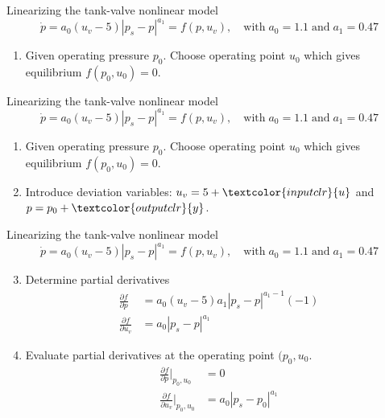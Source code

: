 \documentclass[presentation,aspectratio=169]{beamer}
\begin{document}
\begin{frame}[label={sec:orgcb3dd14}]{Linearizing the tank-valve nonlinear model}
\[ \dot{p} = a_0(u_v - 5)|p_s - p|^{a_1} = f(p, u_v), \quad \text{with} \; a_0=1.1\; \text{and}\; a_1 = 0.47\]
\begin{enumerate}
\item Given operating pressure \(p_0\). Choose operating point \(u_0\) which gives equilibrium \(f(p_0, u_0) = 0\).
\end{enumerate}
\end{frame}


\begin{frame}[label={sec:org56a6724}]{Linearizing the tank-valve nonlinear model}
\[ \dot{p} = a_0(u_v - 5)|p_s - p|^{a_1} = f(p, u_v), \quad \text{with} \; a_0=1.1\; \text{and}\; a_1 = 0.47\]
\begin{enumerate}
\item Given operating pressure \(p_0\). Choose operating point \(u_0\) which gives equilibrium \(f(p_0, u_0) = 0\).
\item Introduce deviation variables: \(u_v = 5 + \textcolor{inputclr}{u}\) and \(p = p_0 + \textcolor{outputclr}{y}\).
\end{enumerate}
\end{frame}


\begin{frame}[label={sec:orga9fd2fc}]{Linearizing the tank-valve nonlinear model}
\[ \dot{p} = a_0(u_v - 5)|p_s - p|^{a_1} = f(p, u_v), \quad \text{with} \; a_0=1.1\; \text{and}\; a_1 = 0.47\]
\begin{enumerate}
\setcounter{enumi}{2}
\item Determine partial derivatives
\begin{align*}
\frac{\partial f}{\partial p} &= a_0(u_v-5)a_1|p_s - p|^{a_1-1}(-1)\\
\frac{\partial f}{\partial u_v} &= a_0|p_s - p|^{a_1}
\end{align*}
\item Evaluate partial derivatives at the operating point \((p_0, u_0\).
\begin{align*}
\frac{\partial f}{\partial p}\big|_{p_0, u_0} &= 0\\
\frac{\partial f}{\partial u_v}\big|_{p_0, u_0} &=  a_0|p_s - p_0|^{a_1}
\end{align*}
\end{enumerate}
\end{frame}
\end{document}
